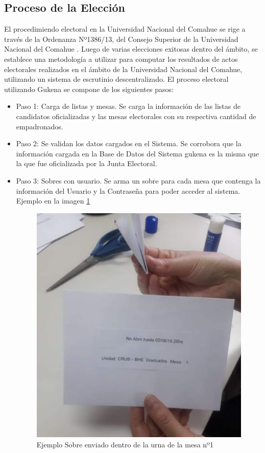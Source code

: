 \subsection{Proceso de la Elección}


El procedimiendo electoral en la Universidad Nacional del Comahue se rige a través de la Ordenanza Nº1386/13, del Consejo Superior de la Universidad Nacional del Comahue \cite{ordenanzaUncoma}. Luego de varias elecciones exitosas dentro del ámbito, se establece una metodología a utilizar para computar los resultados de actos electorales realizados en el ámbito de la Universidad Nacional del Comahue, utilizando un sistema de escrutinio descentralizado. \newline
El proceso electoral utilizando Gukena se compone de los siguientes pasos:
\begin{itemize}
\item Paso 1: Carga de listas y mesas. Se carga la información de las listas de candidatos oficializadas y las mesas electorales con su respectiva cantidad de empadronados.
\item Paso 2: Se validan los datos cargados en el Sistema. Se corrobora que la información cargada en la Base de Datos del Sistema gukena es la misma que la que fue oficializada por la Junta Electoral.
\item Paso 3: Sobres con usuario. Se arma un sobre para cada mesa que contenga la información del Usuario y la Contraseña para poder acceder al sistema. Ejemplo en la imagen \ref{graf:ejemploSobre}

\begin{figure}[h!]
    \begin{center}
        \includegraphics[scale=0.5]{jKz6EB2F9Z.png}
    \end{center}
  \caption{Ejemplo Sobre enviado dentro de la urna de la mesa nº1}
  \label{graf:ejemploSobre}
\end{figure}


\end{itemize}
